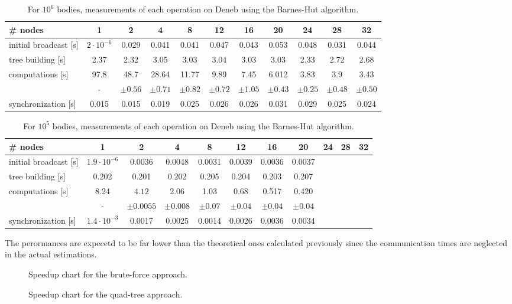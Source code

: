 \begin{table}
\centering
\begin{tabular}{l|cccccccccc}
\# nodes & 1 & 2 & 4 & 8 & 12 & 16 & 20 & 24 & 28 & 32\\
\hline initial broadcast [s] & $2\cdot10^{-6}$ & 0.029 & 0.041 & 0.041 & 0.047 & 0.043 & 0.053 & 0.048 & 0.031 & 0.044\\
tree building [s] & 2.37 & 2.32 & 3.05 & 3.03 & 3.04 & 3.03 & 3.03 & 2.33 & 2.72 & 2.68\\
computations [s] & 97.8 & 48.7 & 28.64 & 11.77 & 9.89 & 7.45 & 6.012 & 3.83 & 3.9 & 3.43 \\
& - & $\pm 0.56$ & $\pm 0.71$ & $\pm 0.82$ & $\pm 0.72$ & $\pm 1.05$ & $\pm 0.43$ & $\pm 0.25$ & $\pm 0.48$ & $\pm 0.50$  \\
synchronization [s] & 0.015 & 0.015 & 0.019 & 0.025 & 0.026 & 0.026 & 0.031 & 0.029 & 0.025 &0.024\\
\end{tabular}
\caption{For $10^6$ bodies, measurements of each operation on Deneb using the Barnes-Hut algorithm.}
\label{tab:qt:measure}
\end{table}

\begin{table}
\centering
\begin{tabular}{l|cccccccccc}
\# nodes & 1 & 2 & 4 & 8 & 12 & 16 & 20 & 24 & 28 & 32\\
\hline initial broadcast [s] & $1.9\cdot10^{-6}$ & 0.0036 & 0.0048 & 0.0031 & 0.0039 & 0.0036 & 0.0037 \\
tree building [s] & 0.202 & 0.201 & 0.202 & 0.205 & 0.204 & 0.203 &0.207 \\
computations [s] & 8.24 & $4.12$ & 2.06 & 1.03 &  0.68  & 0.517 &0.420 \\
& - & $\pm 0.0055$ & $\pm 0.008$ & $\pm0.07$ & $\pm 0.04$ & $\pm 0.04$ & $\pm0.04$  \\
synchronization [s] & $1.4\cdot 10^{-3}$ & 0.0017 & 0.0025 & 0.0014 & 0.0026 &  0.0036& 0.0034 \\
\end{tabular}
\caption{For $10^5$ bodies, measurements of each operation on Deneb using the Barnes-Hut algorithm.}
\label{tab:qt:measure}
\end{table}


The perormances are expecetd to be far lower than the theoretical ones calculated previously since the communication times are neglected in the actual estimations. 
\begin{figure}

\caption{Speedup chart for the brute-force approach.}
\end{figure}

\begin{figure}

\caption{Speedup chart for the quad-tree approach.}
\end{figure}
